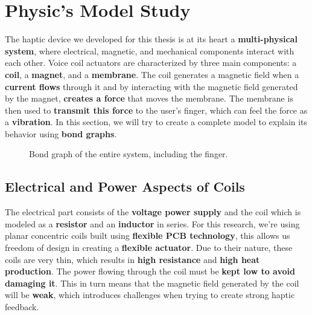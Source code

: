 \section{Physic's Model Study}
The haptic device we developed for this thesis is at its heart a \textbf{multi-physical system}, where electrical, magnetic, and mechanical components interact with each other.
Voice coil actuators are characterized by three main components: a \textbf{coil}, a \textbf{magnet}, and a \textbf{membrane}. The coil generates a magnetic field when a \textbf{current flows} through it and by interacting with the magnetic field generated by the magnet, \textbf{creates a force} that moves the membrane. The membrane is then used to \textbf{transmit this force} to the user's finger, which can feel the force as a \textbf{vibration}.
In this section, we will try to create a complete model to explain its behavior using \textbf{bond graphs}.
\begin{figure}[H]
    \centering
    \resizebox{1\linewidth}{!}{
        
    } %
    \caption{Bond graph of the entire system, including the finger.}
    \label{fig: Total_bond-graph}
\end{figure}

\subsection{Electrical and Power Aspects of Coils}
The electrical part consists of the \textbf{voltage power supply} and the coil which is modeled as a \textbf{resistor} and an \textbf{inductor} in series. For this research, we're using planar concentric coils built using \textbf{flexible PCB technology}, this allows us freedom of design in creating a \textbf{flexible actuator}.
Due to their nature, these coils are very thin, which results in \textbf{high resistance} and \textbf{high heat production}. The power flowing through the coil must be \textbf{kept low to avoid damaging it}. This in turn means that the magnetic field generated by the coil will be \textbf{weak}, which introduces challenges when trying to create strong haptic feedback.

